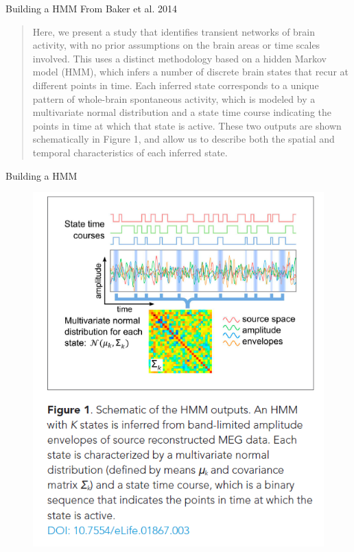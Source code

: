 \documentclass{beamer}
\begin{document}
\begin{frame}{Building a HMM}
	From Baker et al. 2014
\begin{quote}	
Here, we present a study that identifies transient networks of brain activity, with no prior assumptions
on the brain areas or time scales involved. This uses a distinct methodology based on a hidden
Markov model (HMM), which infers a number of discrete brain states that recur at different points in
time. Each inferred state corresponds to a unique pattern of whole-brain spontaneous activity, which
is modeled by a multivariate normal distribution and a state time course indicating the points in time
at which that state is active. These two outputs are shown schematically in Figure 1, and allow us to
describe both the spatial and temporal characteristics of each inferred state.
\end{quote}
\end{frame}

\begin{frame}{Building a HMM}
		\begin{figure}[h]
			\centering
				\includegraphics[scale=0.6]{../Figures/fig_hmm_baker.png}
		\end{figure}
\end{frame}
\end{document}
